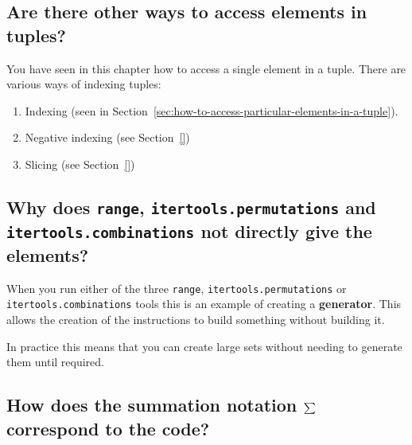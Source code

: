 \subsection{Are there other ways to access elements in tuples?}
\label{\detokenize{tools-for-mathematics/05-combinations-permutations/why/main:are-there-other-ways-to-access-elements-in-tuples}}

You have seen in this chapter how to access a single element in a tuple. There
are various ways of indexing tuples:
\begin{enumerate}

\item 

Indexing (seen in Section~\ref{sec:how-to-access-particular-elements-in-a-tuple}).

\item 

Negative indexing (see Section~\ref{})

\item 

Slicing (see Section~\ref{})

\end{enumerate}


\subsection{Why does \texttt{range}, \texttt{itertools.permutations} and \texttt{itertools.combinations} not directly give the elements?}
\label{\detokenize{tools-for-mathematics/05-combinations-permutations/why/main:why-does-range-itertools-permutations-and-itertools-combinations-not-directly-give-the-elements}}

When you run either of the three \texttt{range}, \texttt{itertools.permutations} or
\texttt{itertools.combinations} tools this is an example of creating a \textbf{generator}.
This allows the creation of the instructions to build something without building
it.


In practice this means that you can create large sets without needing to generate
them until required.


\subsection{How does the summation notation \protect\(\sum\protect\) correspond to the code?}
\label{\detokenize{tools-for-mathematics/05-combinations-permutations/why/main:how-does-the-summation-notation-sum-correspond-to-the-code}}

